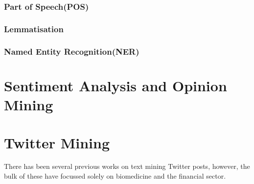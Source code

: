 \subsubsection{Part of Speech(POS)}
\subsubsection{Lemmatisation}
\subsubsection{Named Entity Recognition(NER)}




\section[Sentiment Analysis]{Sentiment Analysis and Opinion Mining}

\section{Twitter Mining}
There has been several previous works on text mining Twitter posts, however, the bulk of these have focussed solely on biomedicine and the financial sector.


